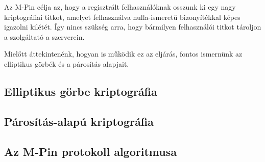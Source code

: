Az M-Pin célja az, hogy a regisztrált felhasználóknak osszunk ki egy nagy kriptográfiai titkot, amelyet felhasználva nulla-ismeretű bizonyítékkal képes igazolni kilétét. Így nincs szükség arra, hogy bármilyen felhasználói titkot tároljon a szolgáltató a szerverein.

Mielőtt áttekintenénk, hogyan is működik ez az eljárás, fontos ismernünk az elliptikus görbék és a párosítás alapjait.

\subsection*{Elliptikus görbe kriptográfia}

\subsection*{Párosítás-alapú kriptográfia}

\subsection*{Az M-Pin protokoll algoritmusa}
